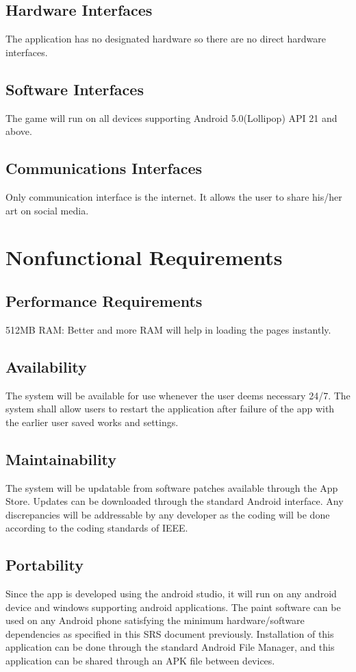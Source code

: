 \documentclass{scrreprt}
\begin{document}
\section{Hardware Interfaces}
The application has no designated hardware so there are no direct hardware interfaces.

\section{Software Interfaces}
The game will run on all devices supporting Android 5.0(Lollipop) API 21 and above.

\section{Communications Interfaces}
Only communication interface is the internet. It allows the user to share his/her art on social media.

\chapter{Nonfunctional Requirements}

\section{Performance Requirements}
512MB RAM: Better and more RAM will help in loading the pages instantly.

\section{Availability}
The system will be available for use whenever the user deems necessary 24/7. The system shall allow users to restart the application after failure of the app with the earlier user saved works and settings.

\section{Maintainability}
The system will be updatable from software patches available through the App Store. Updates can be downloaded through the standard Android interface. Any discrepancies will be addressable by any developer as the coding will be done according to the coding standards of IEEE.

\section{Portability}
Since the app is developed using the android studio, it will run on any android device and windows supporting android applications.
The paint software can be used on any Android phone satisfying the minimum hardware/software dependencies as specified in this SRS document previously. Installation of this application can be done through the standard Android File Manager, and this application can be shared through an APK file between devices.
\end{document}
